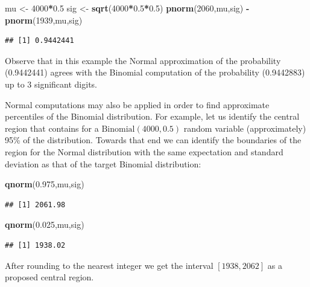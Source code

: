 \documentclass[
]{krantz}
\makeatletter
\newenvironment{Shaded}{\begin{snugshade}}{\end{snugshade}}
\newcommand{\DecValTok}[1]{\textcolor[rgb]{0.00,0.00,0.81}{#1}}
\newcommand{\FloatTok}[1]{\textcolor[rgb]{0.00,0.00,0.81}{#1}}
\newcommand{\KeywordTok}[1]{\textcolor[rgb]{0.13,0.29,0.53}{\textbf{#1}}}
\newcommand{\NormalTok}[1]{#1}
\newcommand{\OperatorTok}[1]{\textcolor[rgb]{0.81,0.36,0.00}{\textbf{#1}}}
\newcommand{\StringTok}[1]{\textcolor[rgb]{0.31,0.60,0.02}{#1}}
\newenvironment{kframe}{%
\medskip{}
\setlength{\fboxsep}{.8em}
 \def\at@end@of@kframe{}%
 \ifinner\ifhmode%
  \def\at@end@of@kframe{\end{minipage}}%
  \begin{minipage}{\columnwidth}%
 \fi\fi%
 \def\FrameCommand##1{\hskip\@totalleftmargin \hskip-\fboxsep
 \colorbox{shadecolor}{##1}\hskip-\fboxsep
     \hskip-\linewidth \hskip-\@totalleftmargin \hskip\columnwidth}%
 \MakeFramed {\advance\hsize-\width
   \@totalleftmargin\z@ \linewidth\hsize
   \@setminipage}}%
 {\par\unskip\endMakeFramed%
 \at@end@of@kframe}
\renewenvironment{Shaded}{\begin{kframe}}{\end{kframe}}
\theoremstyle{definition}
\theoremstyle{definition}
\theoremstyle{definition}
\theoremstyle{remark}
\makeatother
\begin{document}
\begin{Shaded}
\begin{Highlighting}[]
\NormalTok{mu <-}\StringTok{ }\DecValTok{4000}\OperatorTok{*}\FloatTok{0.5}
\NormalTok{sig <-}\StringTok{ }\KeywordTok{sqrt}\NormalTok{(}\DecValTok{4000}\OperatorTok{*}\FloatTok{0.5}\OperatorTok{*}\FloatTok{0.5}\NormalTok{)}
\KeywordTok{pnorm}\NormalTok{(}\DecValTok{2060}\NormalTok{,mu,sig) }\OperatorTok{-}\StringTok{ }\KeywordTok{pnorm}\NormalTok{(}\DecValTok{1939}\NormalTok{,mu,sig)}
\end{Highlighting}
\end{Shaded}

\begin{verbatim}
## [1] 0.9442441
\end{verbatim}

Observe that in this example the Normal approximation of the probability
(0.9442441) agrees with the Binomial computation of the probability
(0.9442883) up to 3 significant digits.

Normal computations may also be applied in order to find approximate
percentiles of the Binomial distribution. For example, let us identify
the central region that contains for a \(\mathrm{Binomial}(4000,0.5)\)
random variable (approximately) 95\% of the distribution. Towards that
end we can identify the boundaries of the region for the Normal
distribution with the same expectation and standard deviation as that of
the target Binomial distribution:

\begin{Shaded}
\begin{Highlighting}[]
\KeywordTok{qnorm}\NormalTok{(}\FloatTok{0.975}\NormalTok{,mu,sig)}
\end{Highlighting}
\end{Shaded}

\begin{verbatim}
## [1] 2061.98
\end{verbatim}

\begin{Shaded}
\begin{Highlighting}[]
\KeywordTok{qnorm}\NormalTok{(}\FloatTok{0.025}\NormalTok{,mu,sig)}
\end{Highlighting}
\end{Shaded}

\begin{verbatim}
## [1] 1938.02
\end{verbatim}

After rounding to the nearest integer we get the interval \([1938,2062]\)
as a proposed central region.
\end{document}
